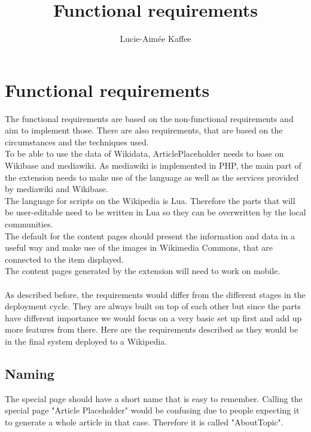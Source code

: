 \documentclass[11pt]{article}
\title {{Functional requirements}}
\author {Lucie-Aim\'{e}e Kaffee}
\date{}
\begin{document}
\listoftodos

\section {Functional requirements}
The functional requirements are based on the non-functional requirements and aim to implement those.
There are also requirements, that are based on the circumstances and the techniques used. \\
To be able to use the data of Wikidata, ArticlePlaceholder needs to base on Wikibase and mediawiki.
As mediawiki is implemented in PHP, the main part of the extension needs to make use of the language as well as the services provided by mediawiki and Wikibase. \\
The language for scripts on the Wikipedia is Lua. Therefore the parts that will be user-editable need to be written in Lua so they can be overwritten by the local communities. \\
The default for the content pages should present the information and data in a useful way and make use of the images in Wikimedia Commons, that are connected to the item displayed.\\
The content pages generated by the extension will need to work on mobile. \\
\\
As described before, the requirements would differ from the different stages in the deployment cycle. They are always built on top of each other but since the parts have different importance we would focus on a very basic set up first and add up more features from there. Here are the requirements described as they would be in the final system deployed to a Wikipedia. \\

\subsection{Naming}
The special page should have a short name that is easy to remember. Calling the special page "Article Placeholder" would be confusing due to people expecting it to generate a whole article in that case. Therefore it is called "AboutTopic".
\end{document}
